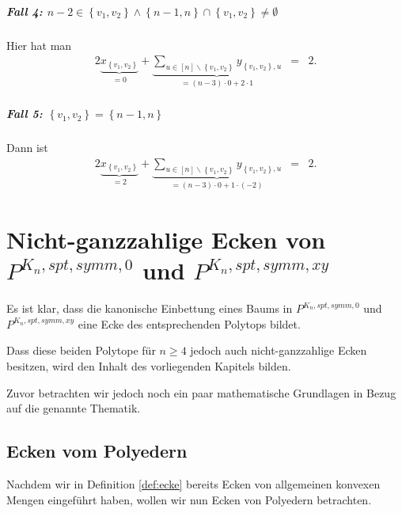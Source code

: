 \documentclass[10p,a4paper,BCOR = 12mm, DIV=15]{scrbook}
\begin{document}
{\begin{bew}
\paragraph{Fall 4: $n-2 \in \left\{v_1, v_2\right\} \wedge \left\{n-1, n\right\} \cap \left\{v_1, v_2\right\} \neq \emptyset$} Hier hat man
\begin{eqnarray*}
2 \underbrace{x_{\left\{v_1, v_2\right\}}}_{= 0} + \underbrace{\sum_{u\in[n]\backslash\left\{v_1, v_2\right\}} y_{\left\{v_1, v_2\right\}, u}}_{= \left(n-3\right) \cdot 0 + 2\cdot 1} & = & 2.
\end{eqnarray*}

\paragraph{Fall 5: $\left\{v_1, v_2\right\} = \left\{n-1, n\right\}$} Dann ist
\begin{eqnarray*}
2 \underbrace{x_{\left\{v_1, v_2\right\}}}_{= 2} + \underbrace{\sum_{u\in[n]\backslash\left\{v_1, v_2\right\}} y_{\left\{v_1, v_2\right\}, u}}_{= \left(n-3\right) \cdot 0 + 1\cdot \left(-2\right)} & = & 2.
\end{eqnarray*}
\end{bew}

\chapter{Nicht-ganzzahlige Ecken von $P^{K_n, spt, symm, 0}$ und $P^{K_n, spt, symm, xy}$}

\label{chap:nichtganzz_ecken}

Es ist klar, dass die kanonische Einbettung eines Baums in $P^{K_n, spt, symm, 0}$ und $P^{K_n, spt, symm, xy}$ eine Ecke des entsprechenden Polytops bildet.

Dass diese beiden Polytope für $n\geq 4$ jedoch auch nicht-ganzzahlige Ecken besitzen, wird den Inhalt des vorliegenden Kapitels bilden.

Zuvor betrachten wir jedoch noch ein paar mathematische Grundlagen in Bezug auf die genannte Thematik.

\section{Ecken vom Polyedern}

\label{sec:ecken}

Nachdem wir in Definition \ref{def:ecke} bereits Ecken von allgemeinen konvexen Mengen eingeführt haben, wollen wir nun Ecken von Polyedern betrachten.

}
\end{document}
